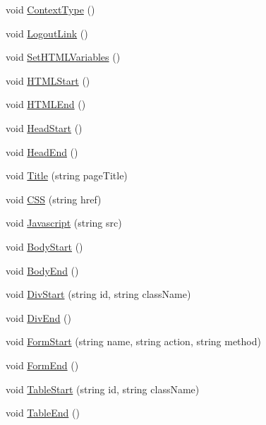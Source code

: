 \begin{DoxyCompactItemize}
\item 
void \hyperlink{classPageLayout_a9884173383d3e9b91e5b4ba6a619caa9}{Context\-Type} ()
\item 
void \hyperlink{classPageLayout_abe2cfa43480c1b48125b3d618cab7831}{Logout\-Link} ()
\item 
void \hyperlink{classPageStructureMaker_aaf78d67380c400cc0057c6519276f721}{Set\-H\-T\-M\-L\-Variables} ()
\item 
void \hyperlink{classPageStructureMaker_ad25d6abc983253567e2370882fc1b407}{H\-T\-M\-L\-Start} ()
\item 
void \hyperlink{classPageStructureMaker_a63b877af1c2c8de8332e3f7eb4c2c2b0}{H\-T\-M\-L\-End} ()
\item 
void \hyperlink{classPageStructureMaker_a14312134cb108f91f2e6d9cbd6916e97}{Head\-Start} ()
\item 
void \hyperlink{classPageStructureMaker_ad64115d592b0989b422a93f85278186e}{Head\-End} ()
\item 
void \hyperlink{classPageStructureMaker_a81e902ddc0c0287df1ba0f614a3774d6}{Title} (string page\-Title)
\item 
void \hyperlink{classPageStructureMaker_aacdb11817f8ab246bc59c552e04e862d}{C\-S\-S} (string href)
\item 
void \hyperlink{classPageStructureMaker_ac221d1169f4dbcef6adb00938919193d}{Javascript} (string src)
\item 
void \hyperlink{classPageStructureMaker_ab7a645675166f34fac99f1ed8feb7c27}{Body\-Start} ()
\item 
void \hyperlink{classPageStructureMaker_ac91e234e2d54dedd9d7e556fabf21d2b}{Body\-End} ()
\item 
void \hyperlink{classPageStructureMaker_a927f92889555dd316c129f706be86a5c}{Div\-Start} (string id, string class\-Name)
\item 
void \hyperlink{classPageStructureMaker_a2913e76bf188ed777dcd33003ef6207d}{Div\-End} ()
\item 
void \hyperlink{classPageStructureMaker_a3f25d5b844a2251883acb80d8fabb77d}{Form\-Start} (string name, string action, string method)
\item 
void \hyperlink{classPageStructureMaker_a65d97f23bb543f3db5201b2009f7f65a}{Form\-End} ()
\item 
void \hyperlink{classPageStructureMaker_a04e68e69005f3933e0f496c3db474daf}{Table\-Start} (string id, string class\-Name)
\item 
void \hyperlink{classPageStructureMaker_a7f8fefbe7a825c1b7761fc8a0f1bb8e4}{Table\-End} ()

\end{DoxyCompactItemize}
